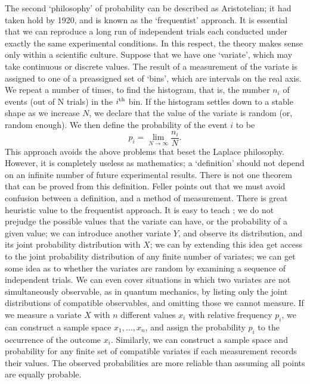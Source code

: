 \documentclass[12pt]{article}
\begin{document}
The second `philosophy' of probability can be described as Aristotelian;
it had taken hold by 1920, and is known as the
`frequentist' approach. It is essential that we can reproduce a long run
of independent trials each conducted under exactly the same experimental
conditions. In this respect, the theory makes sense only within a
scientific culture. Suppose that we have one
`variate', which may take continuous or discrete values. The result
of a measurement of the variate is assigned to one of a
preassigned set of `bins', which are intervals on the real axis.
We repeat a number of times, to find the histogram, that is, the number
$n_i$ of
events (out of N trials) in the $i^{\rm th}$ bin. If the histogram settles
down to a stable shape as we increase $N$, we declare that the value of the
variate is random (or, random enough). We then define the probability of
the event $i$ to be
\begin{equation}
p_i=\lim_{N\rightarrow\infty}\frac{n_i}{N}.
\end{equation}
This approach avoids the above problems that beset the Laplace philosophy.
However, it is completely useless as mathematics; a `definition'
should not depend on an infinite number of future experimental results.
There is not one theorem that can be
proved from this definition. Feller points out that we must avoid
confusion between a definition, and a method of measurement.
There is great heuristic value to the frequentist approach.
It is easy to teach \cite{Decker};
we do not prejudge the possible values that the variate
can have, or the probability of a given value; we can
introduce another variate $Y$, and observe its distribution, and its
joint probability distribution with $X$;
we can by extending this idea get access to the
joint probability distribution of any finite number of variates;
we can get some idea as to whether the variates
are random by examining a sequence of independent trials. We can even cover
situations in which two variates are not simultaneously observable, as in
quantum mechanics, by listing only the joint distributions of compatible
observables, and omitting those we cannot measure.
If we measure a variate $X$ with $n$ different values $x_i$ with relative
frequency $p_i$, we can construct a sample space $x_1,\ldots,x_n$, and
assign the probability $p_i$ to the occurrence of the outcome $x_i$.
Similarly, we can construct a sample space and probability for any
finite set of compatible variates if each measurement records their
values. The observed probabilities are more reliable than assuming all
points are equally probable.
\end{document}
